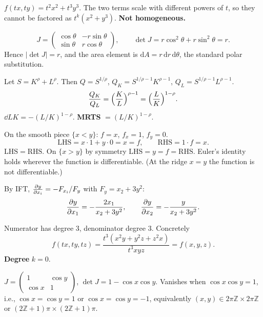 \begin{solutions}
  \item $f(tx,ty)=t^{2}x^{2}+t^{3}y^{3}$. The two terms scale with
        different powers of $t$, so they cannot be factored as
        $t^{k}(x^{2}+y^{3})$. \textbf{Not homogeneous.}

  \item
        \[
          J=\begin{pmatrix} \cos\theta & -r\sin\theta\\
                             \sin\theta & r\cos\theta\end{pmatrix},\qquad
          \det J=r\cos^{2}\theta+r\sin^{2}\theta=r .
        \]
        Hence $|\det J|=r$, and the area element is
        $\mathrm{d}A=r\,\mathrm{d}r\,\mathrm{d}\theta$, the standard
        polar substitution.

  \item Let $S=K^{\rho}+L^{\rho}$. Then $Q=S^{1/\rho}$,
        $Q_{K}=S^{1/\rho-1}K^{\rho-1}$, $Q_{L}=S^{1/\rho-1}L^{\rho-1}$.
        \[
          \frac{Q_{K}}{Q_{L}}=\Bigl(\frac{K}{L}\Bigr)^{\rho-1}
            =\Bigl(\frac{L}{K}\Bigr)^{1-\rho} .
        \]
        $\dd{L}{K}=-(L/K)^{1-\rho}$. \textbf{MRTS} $=(L/K)^{1-\rho}$.

  \item On the smooth piece $\{x<y\}$: $f=x$, $f_{x}=1$, $f_{y}=0$.
        \[
          \mathrm{LHS}=x\cdot 1+y\cdot 0=x=f,\qquad \mathrm{RHS}=1\cdot f=x .
        \]
        $\mathrm{LHS}=\mathrm{RHS}$. \checkmark On $\{x>y\}$ by symmetry
        $\mathrm{LHS}=y=f=\mathrm{RHS}$. \checkmark Euler's identity
        holds wherever the function is differentiable. (At the ridge
        $x=y$ the function is not differentiable.)

  \item By IFT, $\frac{\partial y}{\partial x_{i}}=-F_{x_{i}}/F_{y}$ with
        $F_{y}=x_{2}+3y^{2}$:
        \[
          \frac{\partial y}{\partial x_{1}}=-\frac{2x_{1}}{x_{2}+3y^{2}},\qquad
          \frac{\partial y}{\partial x_{2}}=-\frac{y}{x_{2}+3y^{2}} .
        \]

  \item Numerator has degree $3$, denominator degree $3$. Concretely
        \[
          f(tx,ty,tz)=\frac{t^{3}(x^{2}y+y^{2}z+z^{2}x)}{t^{3}xyz}=f(x,y,z) .
        \]
        \textbf{Degree} $k=0$.

  \item $J=\begin{pmatrix} 1 & \cos y\\ \cos x & 1\end{pmatrix}$,
        $\det J=1-\cos x\cos y$. Vanishes when $\cos x\cos y=1$, i.e.,
        $\cos x=\cos y=1$ or $\cos x=\cos y=-1$, equivalently
        $(x,y)\in 2\pi\mathbb{Z}\times 2\pi\mathbb{Z}$ or
        $(2\mathbb{Z}+1)\pi\times(2\mathbb{Z}+1)\pi$.


\end{solutions}
